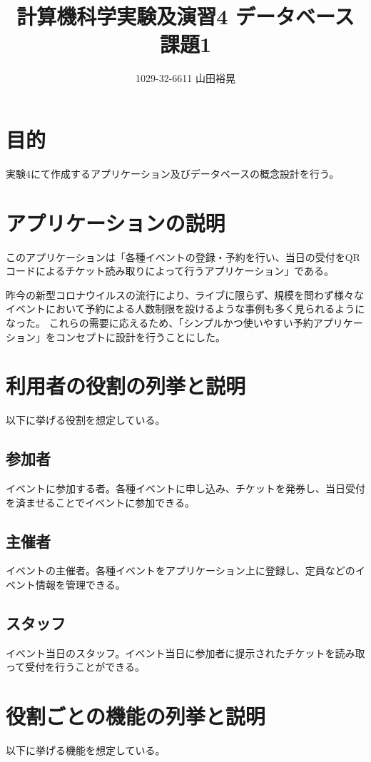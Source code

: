 \documentclass[dvipdfmx]{jarticle}
\begin{document}
\title{計算機科学実験及演習4 データベース 課題1}
\author{1029-32-6611 山田裕晃}
\maketitle

\section{目的}
実験4にて作成するアプリケーション及びデータベースの概念設計を行う。

\section{アプリケーションの説明}
このアプリケーションは「各種イベントの登録・予約を行い、当日の受付をQRコードによるチケット読み取りによって行うアプリケーション」である。

昨今の新型コロナウイルスの流行により、ライブに限らず、規模を問わず様々なイベントにおいて予約による人数制限を設けるような事例も多く見られるようになった。
これらの需要に応えるため、「シンプルかつ使いやすい予約アプリケーション」をコンセプトに設計を行うことにした。

\section{利用者の役割の列挙と説明}
以下に挙げる役割を想定している。
\subsection{参加者}
イベントに参加する者。各種イベントに申し込み、チケットを発券し、当日受付を済ませることでイベントに参加できる。
\subsection{主催者}
イベントの主催者。各種イベントをアプリケーション上に登録し、定員などのイベント情報を管理できる。
\subsection{スタッフ}
イベント当日のスタッフ。イベント当日に参加者に提示されたチケットを読み取って受付を行うことができる。

\section{役割ごとの機能の列挙と説明}
以下に挙げる機能を想定している。
\end{document}
